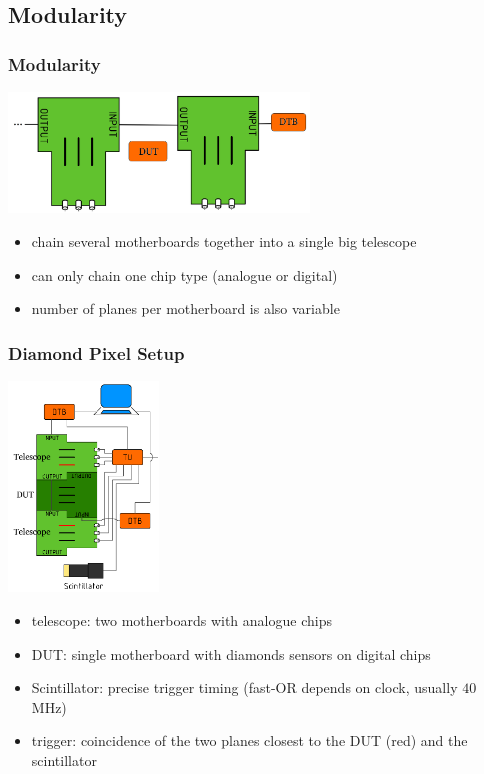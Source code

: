 \documentclass[9pt]{beamer}
\begin{document}
\subsection{Modularity}
\begin{frame}
	\frametitle{Modularity}
	\begin{center}
		\includegraphics[width=8cm]{Modul}
	\end{center}
	\begin{itemize}
		\item chain several motherboards together into a single big telescope
		\item can only chain one chip type (analogue or digital)
		\item number of planes per motherboard is also variable 
	\end{itemize}
\end{frame}
\begin{frame}
	\frametitle{Diamond Pixel Setup}
	\begin{minipage}{4cm}
		\centering
		\includegraphics[width=4cm]{fulltel_scint}
	\end{minipage}
	\hspace*{2pt}
	\begin{minipage}[c][.7\textheight]{7cm}
		\begin{itemize}
			\setlength{\itemsep}{\fill}
			\item telescope: two motherboards with analogue chips 
			\item DUT: single motherboard with diamonds sensors on digital chips
			\item Scintillator: precise trigger timing  (fast-OR depends on clock, usually $40$\,MHz)
			\item trigger: coincidence of the two planes closest to the DUT (red) and the scintillator
		\end{itemize}
	\end{minipage}
\end{frame}
\end{document}
